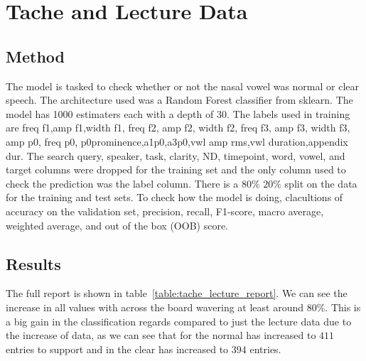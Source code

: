 \documentclass[12pt]{article}
\begin{document}
    \section*{Tache and Lecture Data}
    \subsection*{Method}
    \indent
    \indent
    The model is tasked to check whether or not the nasal vowel was normal or
    clear speech. The architecture used was a Random Forest classifier from sklearn.
    The model has 1000 estimaters each with a depth of 30. The labels used in
    training are freq f1,amp f1,width f1, freq f2, amp f2, width f2, freq f3, amp
    f3, width f3, amp p0, freq p0, p0prominence,a1p0,a3p0,vwl amp rms,vwl duration,appendix
    dur. The search query, speaker, task, clarity, ND, timepoint, word, vowel,
    and target columns were dropped for the training set and the only column
    used to check the prediction was the label column. There is a $80\%$ $20\%$ split
    on the data for the training and test sets. To check how the model is doing, clacultions
    of accuracy on the validation set, precision, recall, F1-score, macro average,
    weighted average, and out of the box (OOB) score.

    \subsection*{Results}
    The full report is shown in table~\ref{table:tache_lecture_report}. We can
    see the increase in all values with across the board wavering at least
    around $80\%$. This is a big gain in the classification regards compared to just
    the lecture data due to the increase of data, as we can see that for the
    normal has increased to $411$ entries to support and in the clear has
    increased to $394$ entries.
\end{document}
